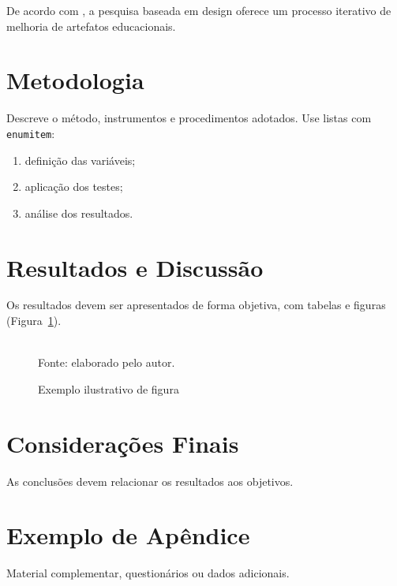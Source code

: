 \documentclass[12pt,oneside]{article}
\begin{document}
De acordo com \cite{pimentelDesignScienceResearch2020}, a pesquisa baseada em
design oferece um processo iterativo de melhoria de artefatos educacionais.

\section{Metodologia}\label{sec:metodologia}
Descreve o método, instrumentos e procedimentos adotados.  
Use listas com \texttt{enumitem}:
\begin{enumerate}[label=\alph*)]
  \item definição das variáveis;
  \item aplicação dos testes;
  \item análise dos resultados.
\end{enumerate}

\section{Resultados e Discussão}\label{sec:resultadosDiscussao}

Os resultados devem ser apresentados de forma objetiva, com tabelas e figuras
(Figura~\ref{fig:exemplo}).

\begin{figure}[ht]
\centering
\caption{Exemplo ilustrativo de figura}
\\[2pt]
{\small Fonte: elaborado pelo autor.}
\label{fig:exemplo}
\end{figure}
\vspace{-6pt}

\section{Considerações Finais}\label{sec:consideracoesFinais}

As conclusões devem relacionar os resultados aos objetivos.  

\printbibliography

\appendix
\renewcommand{\thesection}{Apêndice \Alph{section}}

\section{Exemplo de Apêndice}
Material complementar, questionários ou dados adicionais.
\end{document}
